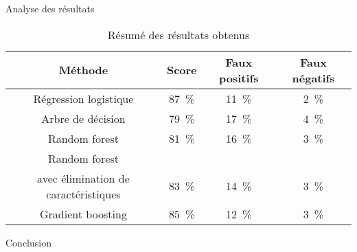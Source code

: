\documentclass{beamer}
\begin{document}
\begin{frame}{Analyse des résultats}
\begin{table}
	\small
	\begin{center}
	\begin{tabular}{cccc}
		\toprule
		Méthode  &	Score  &	Faux positifs  &	Faux négatifs \\
		\midrule
		Régression logistique 	& \SI{87}{\percent} 	 &	\SI{11}{\percent}  	& \SI{2}{\percent} \\
		Arbre de décision & \SI{79}{\percent} & \SI{17}{\percent} & \SI{4}{\percent} \\
		Random forest & \SI{81}{\percent} & \SI{16}{\percent} & \SI{3}{\percent} \\
		Random forest \\ avec élimination de caractéristiques& \SI{83}{\percent} & \SI{14}{\percent} & \SI{3}{\percent} \\
		Gradient boosting & \SI{85}{\percent} & \SI{12}{\percent} & \SI{3}{\percent} \\
		\bottomrule
	\end{tabular}
	\caption{Résumé des résultats obtenus \label{table:results}}
	\end{center}
\end{table}

\end{frame}

\begin{frame}{Conclusion}
\end{frame}
\end{document}
